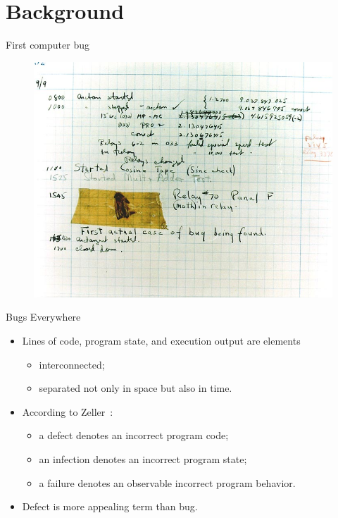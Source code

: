 \documentclass[handout]{beamer}
\begin{document}
\section{Background}

\begin{frame}
    \sectionpage
\end{frame}

\begin{frame}{First computer bug}
    \begin{figure}
        \includegraphics[width=.7\linewidth]{../figures/firstbug}
    \end{figure}
\end{frame}

\begin{frame}{Bugs Everywhere}
    \begin{itemize}
        \item Lines of code, program state, and execution output are elements
            \begin{itemize}
                \item interconnected;
                \item separated not only in space but also in time.
            \end{itemize}
        \item According to Zeller~\cite{zeller2009programs}:
        \begin{itemize}
            \item a defect denotes an incorrect program code;
            \item an infection denotes an incorrect program state;
            \item a failure denotes an observable incorrect program behavior.
        \end{itemize}
        \item Defect is more appealing term than bug.
    \end{itemize}
\end{frame}
\end{document}
